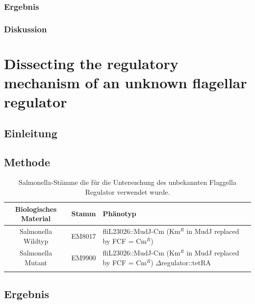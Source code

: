 \documentclass[oneside,10pt,a4paper]{report}
\begin{document}
			\subsection{Ergebnis}
			
			\subsection{Diskussion}
		
		
	\chapter{Dissecting the regulatory mechanism of an unknown flagellar regulator}
		\section{Einleitung}
		
		\section{Methode}
			\begin{table}[H]
			\centering
			\caption{Salmonella-Stämme die für die Untersuchung des unbekannten Flaggella Regulator verwendet wurde.}
			\label{tab: exp8-biologisches Material}
			\begin{tabular}{ccp{5cm}}
				\toprule
				Biologisches Material& Stamm & Phänotyp\\
				\midrule
				\multirow{3}{*}{\parbox[t]{2cm}{Salmonella Wildtyp }}  & \multirow{3}{*}{EM8017} & \multirow{3}{*}{\parbox[t]{5cm}{fliL23026::MudJ-Cm (Km$^R$ in MudJ replaced by FCF = Cm$^R$)}}\\
				&&\\
				&&\\
				\multirow{3}{*}{\parbox[t]{2cm}{Salmonella Mutant}}  & \multirow{3}{*}{EM9900} & \multirow{3}{*}{\parbox[t]{5cm}{fliL23026::MudJ-Cm (Km$^R$ in MudJ replaced by FCF = Cm$^R$) $\Delta$regulator::tetRA}}\\
				&&\\
				&&\\
				&&\\
				\bottomrule			
			\end{tabular}
		\end{table}
		
		\section{Ergebnis}
		
\end{document}
